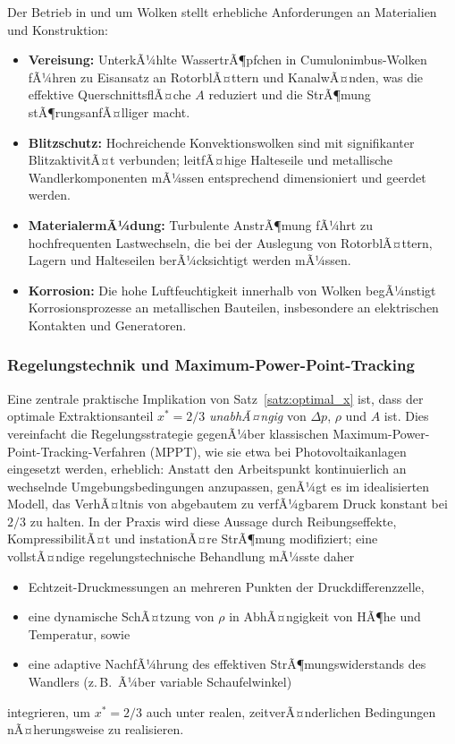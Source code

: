 ﻿\documentclass[a4paper,12pt]{article}
\theoremstyle{definition}
\begin{document}
Der Betrieb in und um Wolken stellt erhebliche Anforderungen an Materialien
und Konstruktion:

\begin{itemize}
	\item \textbf{Vereisung:} UnterkÃ¼hlte WassertrÃ¶pfchen in
	Cumulonimbus-Wolken fÃ¼hren zu Eisansatz an RotorblÃ¤ttern und
	KanalwÃ¤nden, was die effektive QuerschnittsflÃ¤che $A$ reduziert und
	die StrÃ¶mung stÃ¶rungsanfÃ¤lliger macht.
	\item \textbf{Blitzschutz:} Hochreichende Konvektionswolken sind mit
	signifikanter BlitzaktivitÃ¤t verbunden; leitfÃ¤hige Halteseile und
	metallische Wandlerkomponenten mÃ¼ssen entsprechend dimensioniert und
	geerdet werden.
	\item \textbf{MaterialermÃ¼dung:} Turbulente AnstrÃ¶mung fÃ¼hrt zu
	hochfrequenten Lastwechseln, die bei der Auslegung von RotorblÃ¤ttern,
	Lagern und Halteseilen berÃ¼cksichtigt werden mÃ¼ssen.
	\item \textbf{Korrosion:} Die hohe Luftfeuchtigkeit innerhalb von
	Wolken begÃ¼nstigt Korrosionsprozesse an metallischen Bauteilen,
	insbesondere an elektrischen Kontakten und Generatoren.
\end{itemize}

\subsubsection{Regelungstechnik und Maximum-Power-Point-Tracking}

Eine zentrale praktische Implikation von Satz~\ref{satz:optimal_x} ist,
dass der optimale Extraktionsanteil $x^\ast = 2/3$ \emph{unabhÃ¤ngig} von
$\Delta p$, $\rho$ und $A$ ist. Dies vereinfacht die Regelungsstrategie
gegenÃ¼ber klassischen Maximum-Power-Point-Tracking-Verfahren (MPPT), wie
sie etwa bei Photovoltaikanlagen eingesetzt werden, erheblich: Anstatt den
Arbeitspunkt kontinuierlich an wechselnde Umgebungsbedingungen anzupassen,
genÃ¼gt es im idealisierten Modell, das VerhÃ¤ltnis von abgebautem zu
verfÃ¼gbarem Druck konstant bei $2/3$ zu halten. In der Praxis wird diese
Aussage durch Reibungseffekte, KompressibilitÃ¤t und instationÃ¤re StrÃ¶mung
modifiziert; eine vollstÃ¤ndige regelungstechnische Behandlung mÃ¼sste
daher
\begin{itemize}
	\item Echtzeit-Druckmessungen an mehreren Punkten der
	Druckdifferenzzelle,
	\item eine dynamische SchÃ¤tzung von $\rho$ in AbhÃ¤ngigkeit von HÃ¶he
	und Temperatur, sowie
	\item eine adaptive NachfÃ¼hrung des effektiven StrÃ¶mungswiderstands
	des Wandlers (z.\,B.\ Ã¼ber variable Schaufelwinkel)
\end{itemize}
integrieren, um $x^\ast = 2/3$ auch unter realen, zeitverÃ¤nderlichen
Bedingungen nÃ¤herungsweise zu realisieren.
\end{document}
